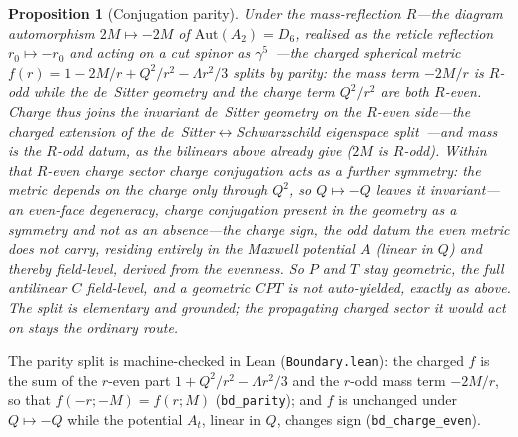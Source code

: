 \documentclass[11pt]{article}
\theoremstyle{plain}
\newtheorem{proposition}{Proposition}
\theoremstyle{remark}
\begin{document}
\begin{proposition}[Conjugation parity]\label{prop:conjugation-parity}
Under the mass-reflection $R$---the diagram automorphism $2M\mapsto-2M$ of $\mathrm{Aut}(A_2)=D_6$, realised as the reticle reflection $r_0\mapsto-r_0$ and acting on a cut spinor as $\gamma^5$~\cite{JanzenGroupoid}---the charged spherical metric $f(r)=1-2M/r+Q^{2}/r^{2}-\Lambda r^{2}/3$ splits by parity: the mass term $-2M/r$ is $R$-\emph{odd} while the de~Sitter geometry \emph{and} the charge term $Q^{2}/r^{2}$ are both $R$-\emph{even}. Charge thus joins the invariant de~Sitter geometry on the $R$-even side---the charged extension of the de~Sitter$\leftrightarrow$Schwarzschild eigenspace split~\cite{JanzenGroupoid}---and mass is the $R$-odd datum, as the bilinears above already give ($2M$ is $R$-odd). Within that $R$-even charge sector charge conjugation acts as a \emph{further} symmetry: the metric depends on the charge only through $Q^{2}$, so $Q\mapsto-Q$ leaves it invariant---an even-face degeneracy, charge conjugation present in the geometry as a symmetry and not as an absence---the charge \emph{sign}, the odd datum the even metric does not carry, residing entirely in the Maxwell potential $A$ (linear in $Q$) and thereby field-level, \emph{derived} from the evenness. So $P$ and $T$ stay geometric, the full antilinear $C$ field-level, and a geometric $CPT$ is not auto-yielded, exactly as above. The split is elementary and grounded; the propagating charged sector it would act on stays the ordinary route.
\end{proposition}

\noindent The parity split is machine-checked in Lean (\texttt{Boundary.lean}): the charged $f$ is the sum of the $r$-even part $1+Q^{2}/r^{2}-\Lambda r^{2}/3$ and the $r$-odd mass term $-2M/r$, so that $f(-r;-M)=f(r;M)$ (\texttt{bd\_parity}); and $f$ is unchanged under $Q\mapsto-Q$ while the potential $A_t$, linear in $Q$, changes sign (\texttt{bd\_charge\_even}).
\end{document}
